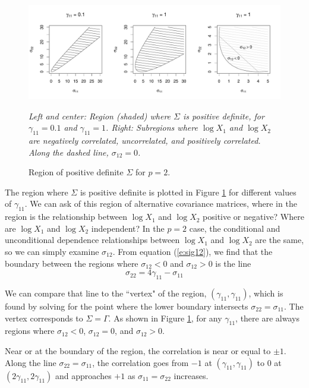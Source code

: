 \documentclass[10pt]{article}
\begin{document}
\begin{figure}
\caption{Region of positive definite $\Sigma$ for $p=2$.}
\label{f:regions}
\begin{center}
\includegraphics[width=6.5in]{figs/regions-2.pdf}
\begin{small}
\textit{Left and center: Region (shaded) where $\Sigma$ is positive definite, for $\gamma_{11} = 0.1$ and $\gamma_{11} = 1$. Right: Subregions where $\log X_1$ and $\log X_2$ are negatively correlated, uncorrelated, and positively correlated. Along the dashed line, $\sigma_{12} = 0$.}
\end{small}
\end{center}
\end{figure}

The region where $\Sigma$ is positive definite is plotted in Figure \ref{f:regions} for different values of $\gamma_{11}$. We can ask of this region of alternative covariance matrices, where in the region is the relationship between $\log X_1$ and $\log X_2$ positive or negative? Where are $\log X_1$ and $\log X_2$ independent? In the $p = 2$ case, the conditional and unconditional dependence relationships between $\log X_1$ and $\log X_2$ are the same, so we can simply examine $\sigma_{12}$. From equation (\ref{e:sig12}), we find that the boundary between the regions where $\sigma_{12} < 0$ and $\sigma_{12} > 0$ is the line
\begin{equation}
\sigma_{22} = 4\gamma_{11} - \sigma_{11}
\end{equation}

We can compare that line to the ``vertex" of the region, $(\gamma_{11}, \gamma_{11})$, which is found by solving for the point where the lower boundary intersects $\sigma_{22} = \sigma_{11}$. The vertex corresponds to $\Sigma = \Gamma$. As shown in Figure \ref{f:regions}, for any $\gamma_{11}$, there are always regions where $\sigma_{12} < 0$, $\sigma_{12} = 0$, and $\sigma_{12} > 0$.

Near or at the boundary of the region, the correlation is near or equal to $\pm 1$. Along the line $\sigma_{22} = \sigma_{11}$, the correlation goes from $-1$ at $(\gamma_{11}, \gamma_{11})$ to 0 at $(2\gamma_{11}, 2\gamma_{11})$ and approaches $+1$ as $\sigma_{11} = \sigma_{22}$ increases.
\end{document}
